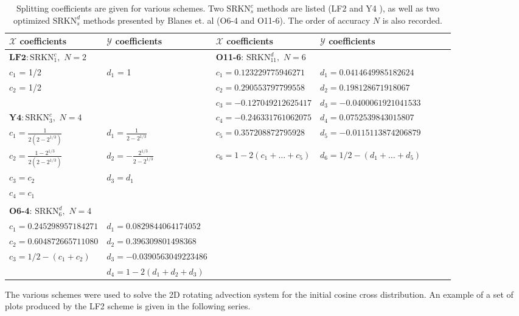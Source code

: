 \documentclass[11pt,titlepage]{report}
\newcommand{\ra}[1]{\renewcommand{\arraystretch}{#1}}
\begin{document}
\begin{table}
\ra{1.3}
\begin{tabular}{@{}lllllll@{}}\toprule[2 pt]
\phantom{a}$\mathcal{X}$ coefficients & $\mathcal{Y}$ coefficients &  $\mathcal{X}$ coefficients & $\mathcal{Y}$ coefficients & \\ \midrule
$\textbf{LF2}: \text{SRKN}_1^c, \,\, N = 2$ & & \textbf{O11-6}: $\text{SRKN}_{11}^d,\,\, N = 6$\\
 $c_1$ = 1/2 & $d_1$ = 1 &   $c_1 = 0.123229775946271 $ & $d_1 = 0.0414649985182624 $ &\\
$c_2$ = 1/2 &  &   $c_2 = 0.290553797799558 $ & $d_2 = 0.198128671918067  $ &\\
&&  $c_3 = -0.127049212625417$ & $d_3 = -0.0400061921041533 $ &\\
$\textbf{Y4}: \text{SRKN}_3^c,\,\, N = 4$ & & $c_4 = -0.246331761062075 $ & $d_4 = 0.0752539843015807 $ &\\
$c_1 =  \frac{1}{2(2 - 2^{1/3})}$ & $d_1 = \frac{1}{2 - 2^{1/3}}$ &  $c_5 = 0.357208872795928 $ & $d_5 = -0.0115113874206879$ &\\ 
$c_2 = \frac{1 - 2^{1/3}}{2(2 - 2^{1/3})}$   & $d_2 = -\frac{2^{1/3}}{2 - 2^{1/3}}$ & $c_6 = 1 - 2(c_1 + \ldots + c_5)$ & $d_6 = 1/2 - (d_1 + \ldots + d_5)$ &\\
$c_3 = c_2$   & $d_3 = d_1$ & \\
$c_4 = c_1$   &  \\
&&&\\
\textbf{O6-4}: $\text{SRKN}_6^d,\,\, N = 4$\\
$c_1 = 0.245298957184271$ & $d_1 = 0.0829844064174052 $ \\
$c_2 = 0.604872665711080$ & $d_2 = 0.396309801498368 $ \\
$c_3 = 1/2 - (c_1 + c_2)$ & $d_3 = -0.0390563049223486  $ \\
 & $d_4 = 1 - 2(d_1 + d_2 + d_3) $ \\
\bottomrule[2 pt]
\end{tabular}
\caption{Splitting coefficients are given for various schemes. Two $\text{SRKN}_s^c$ methods are listed (LF2 and Y4 \cite{Yoshida90}), as well as two optimized  $\text{SRKN}_s^d$ methods presented by Blanes et. al \cite{Blanes02} (O6-4 and O11-6). The order of accuracy $N$ is also recorded. }
\label{tbl:splitting_coefficients}
\end{table}

The various schemes were used to solve the 2D rotating advection system for the initial cosine cross distribution. An example of a set of plots produced by the LF2 scheme is given in the following series.
\end{document}
